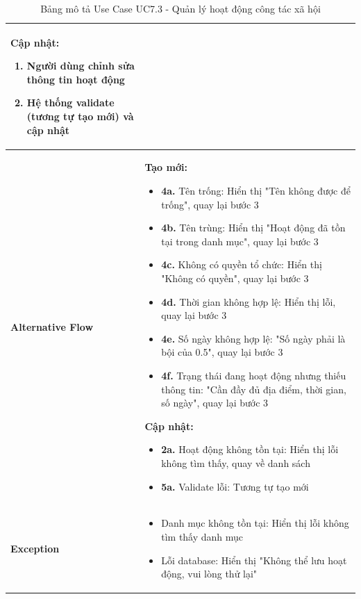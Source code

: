 \begin{table}[H]
\begin{tabular}{|m{}|m{}|}
    \textbf{Cập nhật:}
    \begin{enumerate}
        \item Người dùng chỉnh sửa thông tin hoạt động
        \item Hệ thống validate (tương tự tạo mới) và cập nhật
    \end{enumerate}
    \\ \hline

    \textbf{Alternative Flow} 
    & \textbf{Tạo mới:}
    \begin{itemize}
        \item \textbf{4a.} Tên trống: Hiển thị "Tên không được để trống", quay lại bước 3
        \item \textbf{4b.} Tên trùng: Hiển thị "Hoạt động đã tồn tại trong danh mục", quay lại bước 3
        \item \textbf{4c.} Không có quyền tổ chức: Hiển thị "Không có quyền", quay lại bước 3
        \item \textbf{4d.} Thời gian không hợp lệ: Hiển thị lỗi, quay lại bước 3
        \item \textbf{4e.} Số ngày không hợp lệ: "Số ngày phải là bội của 0.5", quay lại bước 3
        \item \textbf{4f.} Trạng thái đang hoạt động nhưng thiếu thông tin: "Cần đầy đủ địa điểm, thời gian, số ngày", quay lại bước 3
    \end{itemize}

    \textbf{Cập nhật:}
    \begin{itemize}
        \item \textbf{2a.} Hoạt động không tồn tại: Hiển thị lỗi không tìm thấy, quay về danh sách
        \item \textbf{5a.} Validate lỗi: Tương tự tạo mới
    \end{itemize}
    \\ \hline

    \textbf{Exception} 
    & \begin{itemize}
        \item Danh mục không tồn tại: Hiển thị lỗi không tìm thấy danh mục
        \item Lỗi database: Hiển thị "Không thể lưu hoạt động, vui lòng thử lại"
    \end{itemize}
    \\ \hline
    \end{tabular}
    \caption{Bảng mô tả Use Case UC7.3 - Quản lý hoạt động công tác xã hội}
    \end{table}

